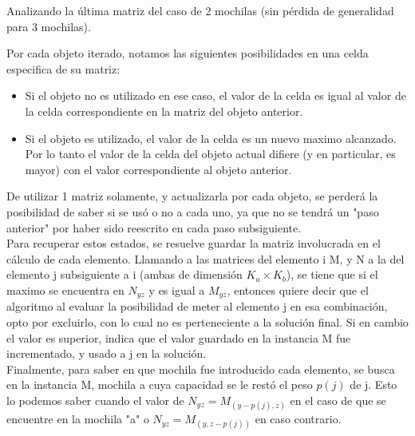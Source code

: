 Analizando la última matriz del caso de 2 mochilas (sin pérdida de generalidad para 3 mochilas). 

Por cada objeto iterado, notamos las siguientes posibilidades en una celda especifica de su matriz:

\begin{itemize}
	\item Si el objeto no es utilizado en ese caso, el valor de la celda es igual al valor de la celda correspondiente en la matriz del objeto anterior.
	\item Si el objeto es utilizado, el valor de la celda es un nuevo maximo alcanzado. Por lo tanto el valor de la celda del objeto actual difiere (y en particular, es mayor) con el valor correspondiente al objeto anterior.
\end{itemize}

De utilizar 1 matriz solamente, y actualizarla por cada objeto, se perderá la posibilidad de saber si se usó o no a cada uno, ya que no se tendrá un "paso anterior" por haber sido reescrito en cada paso subsiguiente. \\


Para recuperar estos estados, se resuelve guardar la matriz involucrada en el c\'alculo de cada elemento. Llamando a las matrices del elemento i M, y N a la del elemento j subsiguiente a i (ambas de dimensión $K_{a} \times K_{b}$), se tiene que si el maximo se encuentra en $N_{yz}$ y es igual a $M_{yz}$, entonces quiere decir que el algoritmo al evaluar la posibilidad de meter al elemento j en esa combinación, opto por excluirlo, con lo cual no es perteneciente a la solución final. Si en cambio el valor es superior, indica que el valor guardado en la instancia M fue incrementado, y usado a j en la solución.\\

Finalmente, para saber en que mochila fue introducido cada elemento, se busca en la instancia M, mochila a cuya capacidad se le restó el peso $p(j)$ de j. Esto lo podemos saber cuando el valor de $N_{yz} = M_{(y-p(j),z)}$ en el caso de que se encuentre en la mochila "a" o $N_{yz} = M_{(y,z-p(j))}$ en caso contrario.\\

